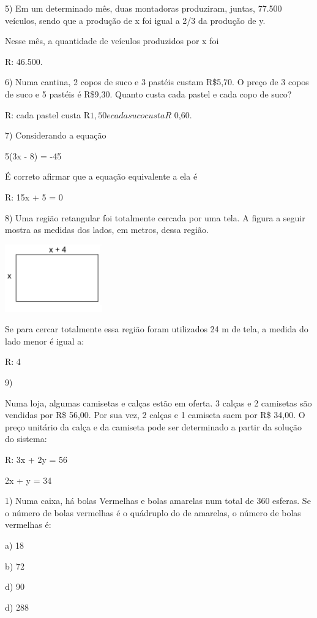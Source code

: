 5) Em um determinado mês, duas montadoras produziram, juntas, 77.500
veículos, sendo que a produção de x foi igual a 2/3 da produção de y.

Nesse mês, a quantidade de veículos produzidos por x foi

R: 46.500.

6) Numa cantina, 2 copos de suco e 3 pastéis custam R\$5,70. O preço de
3 copos de suco e 5 pastéis é R\$9,30. Quanto custa cada pastel e cada
copo de suco?

R: cada pastel custa R\(1,50 e cada suco custa R\) 0,60.

7) Considerando a equação

5(3x - 8) = -45

É correto afirmar que a equação equivalente a ela é

R: 15x + 5 = 0

8) Uma região retangular foi totalmente cercada por uma tela. A figura a
seguir mostra as medidas dos lados, em metros, dessa região.

\includegraphics[width=1.65625in,height=1.14583in]{./imgSAEB_6_MAT/media/image38.png}

Se para cercar totalmente essa região foram utilizados 24 m de tela, a
medida do lado menor é igual a:

R: 4

9)

Numa loja, algumas camisetas e calças estão em oferta. 3 calças e 2
camisetas são vendidas por R\$ 56,00. Por sua vez, 2 calças e 1 camiseta
saem por R\$ 34,00. O preço unitário da calça e da camiseta pode ser
determinado a partir da solução do sistema:

R: 3x + 2y = 56

2x + y = 34


1) Numa caixa, há bolas Vermelhas e bolas amarelas num total de 360
esferas. Se o número de bolas vermelhas é o quádruplo do de amarelas, o
número de bolas vermelhas é:

a) 18

b) 72

d) 90

d) 288

